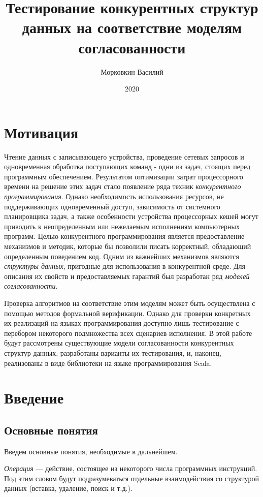 \documentclass[14pt, openany]{book}
\title{Тестирование конкурентных структур данных на соответствие моделям согласованности}
\author{Морковкин Василий}
\date{2020}
\begin{document}
\maketitle
\chapter*{Мотивация}
\par
Чтение данных с записывающего устройства, проведение сетевых запросов и одновременная обработка поступающих команд - одни из задач, стоящих перед программным обеспечением. Результатом оптимизации затрат процессорного времени на решение этих задач стало появление ряда техник  \textit{конкурентного программирования}. Однако необходимость использования ресурсов, не поддерживающих одновременный доступ, зависимость от системного планировщика задач, а также особенности устройства процессорных кешей могут приводить к неопределенным или нежелаемым исполнениям компьютерных программ. Целью конкурентного программирования является предоставление механизмов и методик, которые бы позволили писать корректный, обладающий определенным поведением код. Одним из важнейших механизмов являются \textit{структуры данных}, пригодные для использования в конкурентной среде. Для описания их свойств и предоставляемых гарантий был разработан ряд \textit{моделей согласованности}. \par
Проверка алгоритмов на соответствие этим моделям может быть осуществлена с помощью методов формальной верификации. Однако для проверки конкретных их реализаций на языках программирования доступно лишь тестирование с перебором некоторого подмножества всех сценариев исполнения. В этой работе будут рассмотрены существующие модели согласованности конкурентных структур данных, разработаны варианты их тестирования, и, наконец, реализованы в виде библиотеки на языке программирования Scala.
\setcounter{page}{1}
\tableofcontents
\clearpage



\chapter{Введение}

\section{Основные понятия}
Введем основные понятия, необходимые в дальнейшем.

\emph{Операция} --- действие, состоящее из некоторого числа программных инструкций. Под этим словом будут подразумеваться отдельные взаимодействия со структурой данных (вставка, удаление, поиск и т.д.).
\end{document}
